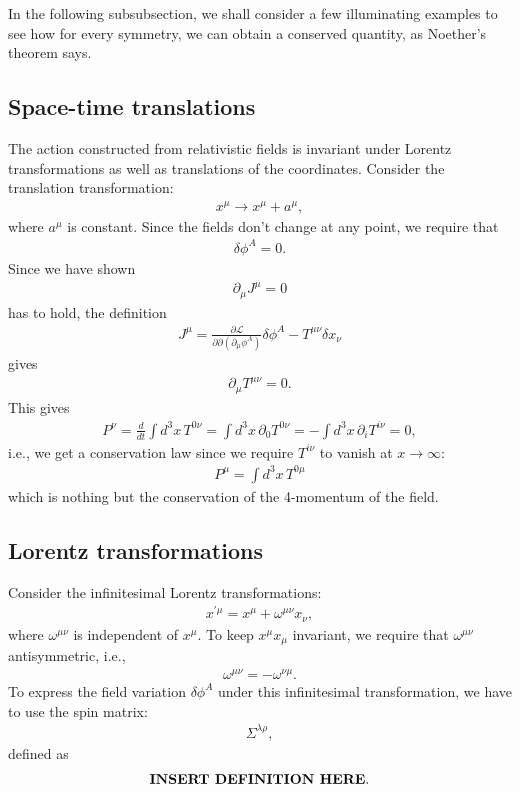 \documentclass{book}
\numberwithin{equation}{section}
\theoremstyle{definition}
\newcommand{\p}{\partial}
\newcommand{\lag}{\mathcal{L}}
\begin{document}
In the following subsubsection, we shall consider a few illuminating examples to see how for every symmetry, we can obtain a conserved quantity, as Noether's theorem says.\\

\subsection{Space-time translations}


The action constructed from relativistic fields is invariant under Lorentz transformations as well as translations of the coordinates. Consider the translation transformation:
\begin{align}
x^\mu \to x^\mu + a^\mu,
\end{align}
where $a^\mu$ is constant. Since the fields don't change at any point, we require that
\begin{align}
\delta \phi^A = 0.
\end{align}
Since we have shown 
\begin{align}
\p_\mu J^\mu = 0
\end{align}
has to hold, the definition
\begin{align}
J^\mu = \frac{\p \lag}{\p \p(\p_\mu \phi^A)}\delta \phi^A - T^{\mu\nu}\delta x_\nu
\end{align}
gives
\begin{align}
\p_\mu T^{\mu\nu} = 0.
\end{align}
This gives
\begin{align}
P^\nu = \frac{d}{dt}\int d^3x\, T^{0\nu} = \int d^3x\, \p_0 T^{0\nu} = - \int d^3x\, \p_i T^{i\nu} = 0,
\end{align}
i.e., we get a conservation law since we require $T^{i\nu}$ to vanish at $x \to \infty$:
\begin{align}
\boxed{P^\mu = \int d^3x\, T^{0\mu}}
\end{align}
which is nothing but the conservation of the 4-momentum of the field.




\subsection{Lorentz transformations}


Consider the infinitesimal Lorentz transformations:
\begin{align}
x^{'\mu} = x^\mu + \omega^{\mu\nu}x_\nu,
\end{align}
where $\omega^{\mu\nu}$ is independent of $x^\mu$. To keep $x^\mu x_\mu$ invariant, we require that $\omega^{\mu\nu}$ antisymmetric, i.e.,
\begin{align}
\omega^{\mu\nu} = -\omega^{\nu\mu}.
\end{align}
To express the field variation $\delta \phi^A$ under this infinitesimal transformation, we have to use the spin matrix:
\begin{align}
\Sigma^{\lambda\rho},
\end{align}
defined as
\begin{align}
\text{\textbf{INSERT DEFINITION HERE}}.
\end{align}
\end{document}
